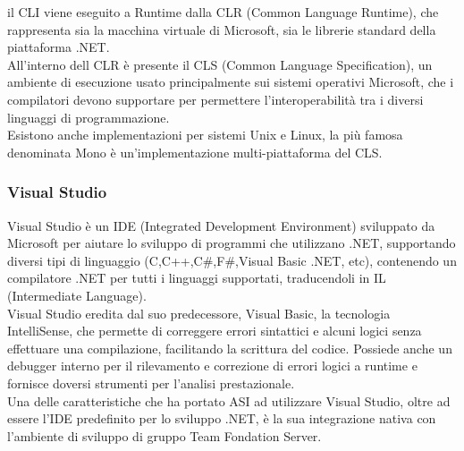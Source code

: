 il CLI viene eseguito a Runtime dalla CLR (Common Language Runtime), che rappresenta sia la macchina virtuale di Microsoft, sia le librerie standard della piattaforma .NET.
\\
All'interno dell CLR è presente il CLS (Common Language Specification), un ambiente di esecuzione usato principalmente sui sistemi operativi Microsoft, che i compilatori devono supportare per permettere l'interoperabilità tra i diversi linguaggi di programmazione.
\\
Esistono anche implementazioni per sistemi Unix e Linux, la più famosa denominata Mono è un'implementazione multi-piattaforma del CLS.

\subsubsection{Visual Studio}
Visual Studio è un IDE (Integrated Development Environment) sviluppato da Microsoft per aiutare lo sviluppo di programmi che utilizzano .NET, supportando diversi tipi di linguaggio (C,C++,C\#,F\#,Visual Basic .NET, etc), contenendo un compilatore .NET per tutti i linguaggi supportati, traducendoli in IL (Intermediate Language).
\\
Visual Studio eredita dal suo predecessore, Visual Basic, la tecnologia IntelliSense, che permette di correggere errori sintattici e alcuni logici senza effettuare una compilazione, facilitando la scrittura del codice. Possiede anche un debugger interno per il rilevamento e correzione di errori logici a runtime e fornisce doversi strumenti per l'analisi prestazionale.
\\
Una delle caratteristiche che ha portato ASI ad utilizzare Visual Studio, oltre ad essere l'IDE predefinito per lo sviluppo .NET, è la sua integrazione nativa con l'ambiente di sviluppo di gruppo Team Fondation Server.

